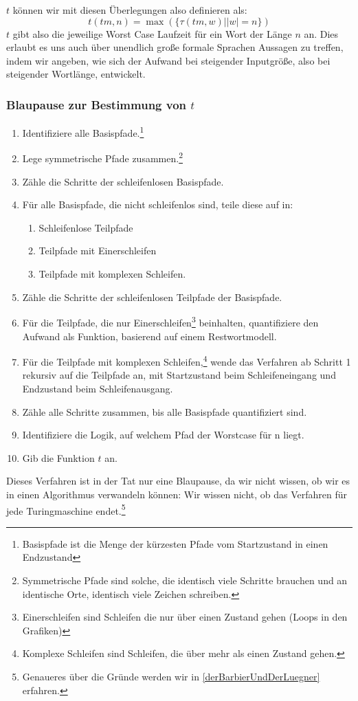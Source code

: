 $t$ können wir mit diesen Überlegungen also definieren als:
\[
t(tm, n) = \max(\{\tau(tm, w)| |w| = n\})
\]
$t$ gibt also die jeweilige Worst Case Laufzeit für ein Wort der Länge $n$ an.
Dies erlaubt es uns auch über unendlich große formale Sprachen Aussagen zu treffen,
indem wir angeben,
wie sich der Aufwand bei steigender Inputgröße,
also bei steigender Wortlänge, entwickelt.

\subsubsection{Blaupause zur Bestimmung von $t$}

\begin{enumerate}
    \item Identifiziere alle Basispfade.\footnote{%
            Basispfade ist die Menge der kürzesten Pfade vom Startzustand in einen Endzustand}
    \item Lege symmetrische Pfade zusammen.\footnote{%
            Symmetrische Pfade sind solche,
            die identisch viele Schritte brauchen und an identische Orte,
            identisch viele Zeichen schreiben.}
    \item Zähle die Schritte der schleifenlosen Basispfade.
    \item Für alle Basispfade, die nicht schleifenlos sind, teile diese auf in:
        \begin{enumerate}
                \item Schleifenlose Teilpfade
                \item Teilpfade mit Einerschleifen
                \item Teilpfade mit komplexen Schleifen.
        \end{enumerate}
    \item Zähle die Schritte der schleifenlosen Teilpfade der Basispfade.
    \item Für die Teilpfade, die nur Einerschleifen\footnote{%
            Einerschleifen sind Schleifen die nur über einen Zustand gehen (Loops in den Grafiken)}
        beinhalten,
        quantifiziere den Aufwand als Funktion, basierend auf einem Restwortmodell.
    \item Für die Teilpfade mit komplexen Schleifen,\footnote{%
            Komplexe Schleifen sind Schleifen, die über mehr als einen Zustand gehen.}
            wende das Verfahren ab Schritt 1
        rekursiv auf die Teilpfade an, mit Startzustand beim Schleifeneingang
        und Endzustand beim Schleifenausgang.
    \item Zähle alle Schritte zusammen, bis alle Basispfade quantifiziert sind.
    \item Identifiziere die Logik, auf welchem Pfad der Worstcase für n liegt.
    \item Gib die Funktion $t$ an.
\end{enumerate}
Dieses Verfahren ist in der Tat nur eine Blaupause,
da wir nicht wissen, ob wir es in einen Algorithmus verwandeln können:
Wir wissen nicht, ob das Verfahren für jede Turingmaschine endet.\footnote{%
    Genaueres über die Gründe werden wir in \autoref{derBarbierUndDerLuegner} erfahren.}

